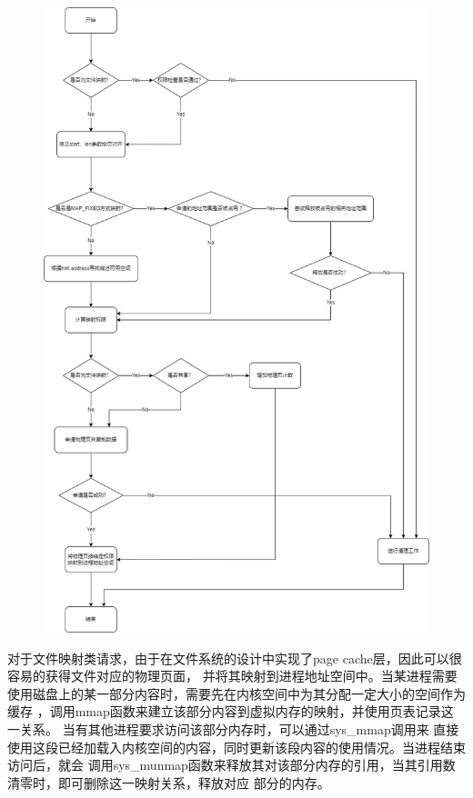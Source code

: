 \documentclass[UTF8,a4paper,10pt]{ctexart}
\begin{document}
\begin{figure}[H]
  \centering
  \includegraphics[scale=0.5]{image/mem04.png}
\end{figure}

对于文件映射类请求，由于在文件系统的设计中实现了page cache层，因此可以很容易的获得文件对应的物理页面，
并将其映射到进程地址空间中。当某进程需要使用磁盘上的某一部分内容时，需要先在内核空间中为其分配一定大小的空间作为缓存
，调用mmap函数来建立该部分内容到虚拟内存的映射，并使用页表记录这一关系。
当有其他进程要求访问该部分内存时，可以通过sys\_mmap调用来
直接使用这段已经加载入内核空间的内容，同时更新该段内容的使用情况。当进程结束访问后，就会
调用sys\_munmap函数来释放其对该部分内存的引用，当其引用数清零时，即可删除这一映射关系，释放对应
部分的内存。
\end{document}
